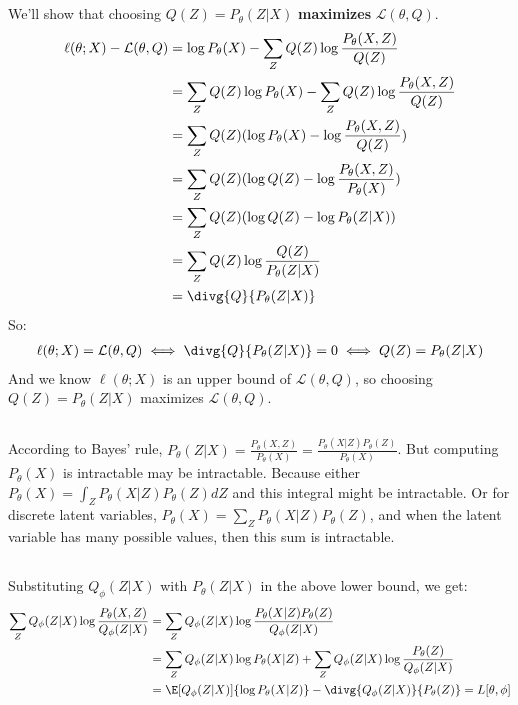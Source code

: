 \documentclass{article}
\begin{document}
\subsection{}
We'll show that choosing \(Q(Z) = P_\theta(Z|X)\) \textbf{maximizes} \(\mathcal{L}(\theta, Q)\).\\
\begin{align*}
\ell(\theta; X) - \mathcal{L}(\theta, Q) &= \log P_\theta(X) - \sum_{Z} Q(Z) \log \frac{P_\theta(X, Z)}{Q(Z)}\\
&= \sum_{Z} Q(Z) \log P_\theta(X) - \sum_{Z} Q(Z) \log \frac{P_\theta(X, Z)}{Q(Z)}\\
&= \sum_{Z} Q(Z) (\log P_\theta(X) - \log \frac{P_\theta(X, Z)}{Q(Z)})\\
&= \sum_{Z} Q(Z) (\log Q(Z) - \log \frac{P_\theta(X, Z)}{P_\theta(X)})\\
&= \sum_{Z} Q(Z) (\log Q(Z) - \log P_\theta(Z|X))\\
&= \sum_{Z} Q(Z) \log \frac{Q(Z)}{P_\theta(Z|X)}\\
&= \divg{Q}{P_\theta(Z|X)}
\end{align*}
So:
\begin{align*}
\ell(\theta; X) = \mathcal{L}(\theta, Q) \iff \divg{Q}{P_\theta(Z|X)} = 0 \iff Q(Z) = P_\theta(Z|X)
\end{align*}
And we know \(\ell(\theta; X)\) is an upper bound of \(\mathcal{L}(\theta, Q)\), so choosing \(Q(Z) = P_\theta(Z|X)\) maximizes \(\mathcal{L}(\theta, Q)\).

\subsection{}
According to Bayes' rule, \(P_\theta(Z|X) = \frac{P_\theta(X, Z)}{P_\theta(X)} = \frac{P_\theta(X|Z)P_\theta(Z)}{P_\theta(X)}\).
But computing \(P_\theta(X)\) is intractable may be intractable. Because either \(P_\theta(X) = \int_Z P_\theta(X|Z)P_\theta(Z) dZ\) and this integral might be intractable. Or for discrete latent variables, \(P_\theta(X) = \sum_Z P_\theta(X|Z)P_\theta(Z)\), and when the latent variable has many possible values, then this sum is intractable. 

\subsection{}
Substituting \(Q_\phi(Z|X)\) with \(P_\theta(Z|X)\) in the above lower bound, we get:
\begin{align*}
\sum_{Z} Q_\phi(Z|X) \log \frac{P_\theta(X, Z)}{Q_\phi(Z|X)} &= \sum_{Z} Q_\phi(Z|X) \log \frac{P_\theta(X|Z)P_\theta(Z)}{Q_\phi(Z|X)}\\
&= \sum_{Z} Q_\phi(Z|X) \log P_\theta(X|Z) + \sum_{Z} Q_\phi(Z|X) \log \frac{P_\theta(Z)}{Q_\phi(Z|X)}\\
&= \E[Q_\phi(Z|X)]{\log P_\theta(X|Z)} - \divg{Q_\phi(Z|X)}{P_\theta(Z)} = L[\theta, \phi]
\end{align*}
\end{document}
